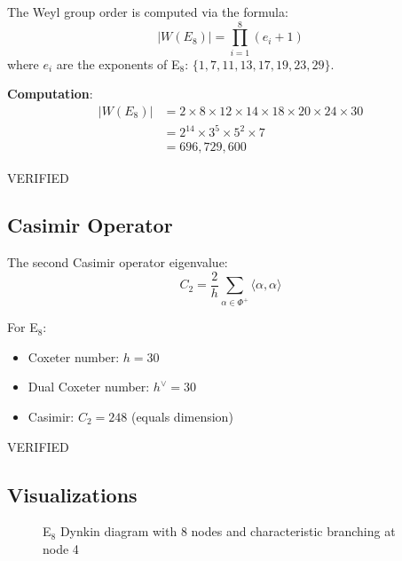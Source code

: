 The Weyl group order is computed via the formula:
\begin{equation}
|W(E_8)| = \prod_{i=1}^{8} (e_i + 1)
\end{equation}
where $e_i$ are the exponents of E$_8$: $\{1, 7, 11, 13, 17, 19, 23, 29\}$.

\textbf{Computation}:
\begin{align}
|W(E_8)| &= 2 \times 8 \times 12 \times 14 \times 18 \times 20 \times 24 \times 30 \\
&= 2^{14} \times 3^5 \times 5^2 \times 7 \\
&= 696,729,600
\end{align}

\textcolor{validcolor}{VERIFIED}

\subsection{Casimir Operator}

The second Casimir operator eigenvalue:
\begin{equation}
C_2 = \frac{2}{h} \sum_{\alpha \in \Phi^+} \langle \alpha, \alpha \rangle
\end{equation}

For E$_8$:
\begin{itemize}
    \item Coxeter number: $h = 30$
    \item Dual Coxeter number: $h^\vee = 30$
    \item Casimir: $C_2 = 248$ (equals dimension)
\end{itemize}

\textcolor{validcolor}{VERIFIED}

\subsection{Visualizations}

\begin{figure}[H]
\centering
{}
\caption{E$_8$ Dynkin diagram with 8 nodes and characteristic branching at node 4}
\label{fig:e8_dynkin}
\end{figure}

